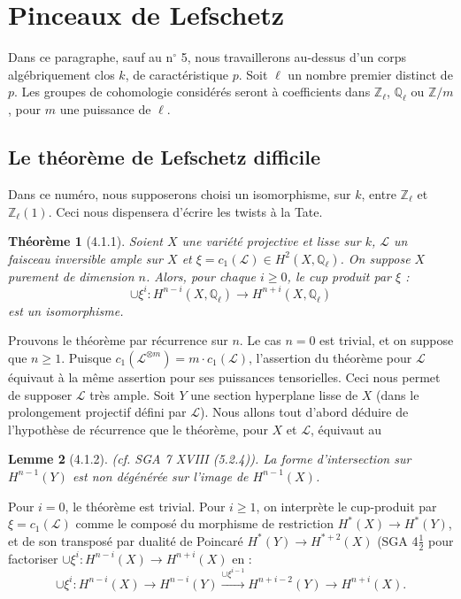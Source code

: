 \documentclass[12pt,a4paper]{article}
\theoremstyle{plain}
\newtheorem{theorem}{Th\'eor\`eme}[section]
\newtheorem{lemma}[theorem]{Lemme}
\theoremstyle{definition}
\theoremstyle{remark}
\newcommand{\QQ}{{\mathbb{Q}}}
\newcommand{\ZZ}{{\mathbb{Z}}}
\begin{document}
\newpage
\section{Pinceaux de Lefschetz}

Dans ce paragraphe, sauf au n$^\circ$ 5, nous travaillerons au-dessus d'un corps alg\'ebriquement clos $k$, de caract\'eristique $p$. Soit $\ell$ un nombre premier distinct de $p$. Les groupes de cohomologie consid\'er\'es seront \`a coefficients dans $\ZZ_\ell$, $\QQ_\ell$ ou $\ZZ/m$, pour $m$ une puissance de $\ell$.

\subsection{Le th\'eor\`eme de Lefschetz difficile}

Dans ce num\'ero, nous supposerons choisi un isomorphisme, sur $k$, entre $\ZZ_\ell$ et $\ZZ_\ell(1)$. Ceci nous dispensera d'\'ecrire les twists \`a la Tate.

\begin{theorem}[4.1.1]
Soient $X$ une vari\'et\'e projective et lisse sur $k$, $\mathscr{L}$ un faisceau inversible ample sur $X$ et $\xi = c_1(\mathscr{L}) \in H^2(X, \QQ_\ell)$. On suppose $X$ purement de dimension $n$. Alors, pour chaque $i \geq 0$, le cup produit par $\xi$ :
\[ \cup \xi^i : H^{n-i}(X, \QQ_\ell) \to H^{n+i}(X, \QQ_\ell) \]
est un isomorphisme.
\end{theorem}

Prouvons le th\'eor\`eme par r\'ecurrence sur $n$. Le cas $n = 0$ est trivial, et on suppose que $n \geq 1$. Puisque $c_1(\mathscr{L}^{\otimes m}) = m \cdot c_1(\mathscr{L})$, l'assertion du th\'eor\`eme pour $\mathscr{L}$ \'equivaut \`a la m\^eme assertion pour ses puissances tensorielles. Ceci nous permet de supposer $\mathscr{L}$ tr\`es ample. Soit $Y$ une section hyperplane lisse de $X$ (dans le prolongement projectif d\'efini par $\mathscr{L}$). Nous allons tout d'abord d\'eduire de l'hypoth\`ese de r\'ecurrence que le th\'eor\`eme, pour $X$ et $\mathscr{L}$, \'equivaut au

\begin{lemma}[4.1.2]
(cf. SGA 7 XVIII (5.2.4)). La forme d'intersection sur $H^{n-1}(Y)$ est non d\'eg\'en\'er\'ee sur l'image de $H^{n-1}(X)$.
\end{lemma}

Pour $i = 0$, le th\'eor\`eme est trivial. Pour $i \geq 1$, on interpr\`ete le cup-produit par $\xi = c_1(\mathscr{L})$ comme le compos\'e du morphisme de restriction $H^*(X) \to H^*(Y)$, et de son transpos\'e par dualit\'e de Poincar\'e $H^*(Y) \to H^{*+2}(X)$ (SGA 4$\frac{1}{2}$ pour factoriser $\cup \xi^i : H^{n-i}(X) \to H^{n+i}(X)$ en :
\[ \cup \xi^i : H^{n-i}(X) \to H^{n-i}(Y) \xrightarrow{\cup \xi^{i-1}} H^{n+i-2}(Y) \to H^{n+i}(X). \]
\end{document}
